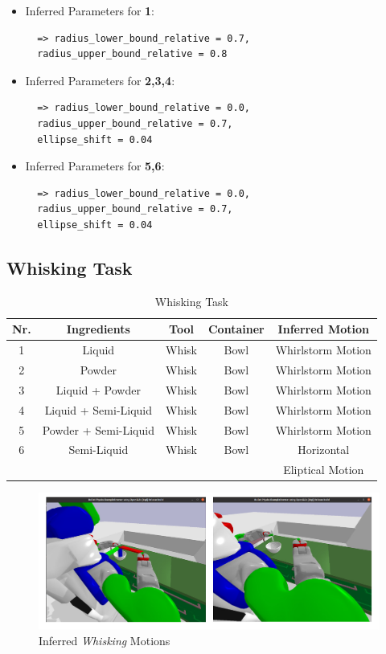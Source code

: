\begin{itemize}
\item Inferred Parameters for \textbf{1}: 
 \begin{lstlisting}
  => radius_lower_bound_relative = 0.7, 
  radius_upper_bound_relative = 0.8
\end{lstlisting}
\item Inferred Parameters for \textbf{2,3,4}:
\begin{lstlisting}
  => radius_lower_bound_relative = 0.0, 
  radius_upper_bound_relative = 0.7,
  ellipse_shift = 0.04
\end{lstlisting}
\item Inferred Parameters for \textbf{5,6}:
\begin{lstlisting}
  => radius_lower_bound_relative = 0.0, 
  radius_upper_bound_relative = 0.7,
  ellipse_shift = 0.04
\end{lstlisting}
\end{itemize}

\subsection*{Whisking Task}

\begin{table}[H]
  \centering
  \begin{tabular}{|c|c|c|c|c|}
    \hline
    \textbf{Nr.} & \textbf{Ingredients} & \textbf{Tool} & \textbf{Container} & \textbf{Inferred Motion}  \\
    \hline
    1 & Liquid & Whisk & Bowl & Whirlstorm Motion \\
    \hline
    2 & Powder & Whisk & Bowl & Whirlstorm Motion\\
    \hline
    3 & Liquid + Powder & Whisk & Bowl & Whirlstorm Motion \\
    \hline
    4 & Liquid + Semi-Liquid & Whisk & Bowl & Whirlstorm Motion \\
    \hline
    5 & Powder + Semi-Liquid & Whisk & Bowl & Whirlstorm Motion \\
    \hline
    6 & Semi-Liquid & Whisk & Bowl & Horizontal
    \\ & & &  &Eliptical Motion \\
    \hline
  \end{tabular}
  \caption{Whisking Task}
  \label{tab:mixingtask}
\end{table}
\begin{figure}[H]
  \includegraphics[scale=0.25]{Graphics/whisking_evaluation.jpg}
  \caption{Inferred \textit{Whisking} Motions}
  \label{fig:mixingverb WikiHow}
\end{figure}

